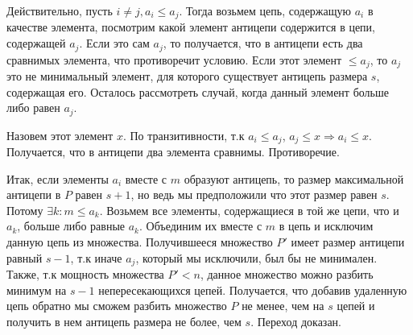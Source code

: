 {    Действительно, пусть $i \neq j, a_i \le a_j$. Тогда возьмем цепь, содержащую $a_i$ в качестве элемента, посмотрим какой элемент антицепи содержится в цепи, содержащей $a_j$. Если это сам $a_j$, то получается, что в антицепи есть два сравнимых элемента, что противоречит условию. Если этот элемент $\le a_j$, то $a_j$ это не минимальный элемент, для которого существует антицепь размера $s$, содержащая его. Осталось рассмотреть случай, когда данный элемент больше либо равен $a_j$.

    Назовем этот элемент $x$. По транзитивности, т.к $a_i \le a_j$, $a_j \le x \Rightarrow a_i \le x$. Получается, что в антицепи два элемента сравнимы. Противоречие.

    Итак, если элементы $a_i$ вместе с $m$ образуют антицепь, то размер максимальной антицепи в $P$ равен $s + 1$, но ведь мы предположили что этот размер равен $s$. Потому $\exists k: m \le a_k$. Возьмем все элементы, содержащиеся в той же цепи, что и $a_k$, больше либо равные $a_k$. Объединим их вместе с $m$ в цепь и исключим данную цепь из множества. Получившееся множество $P'$ имеет размер антицепи равный $s - 1$, т.к иначе $a_j$, который мы исключили, был бы не минимален. Также, т.к мощность множества $P' < n$, данное множество можно разбить минимум на $s - 1$ непересекающихся цепей. Получается, что добавив удаленную цепь обратно мы сможем разбить множество $P$ не менее, чем на $s$ цепей и получить в нем антицепь размера не более, чем $s$. Переход доказан.
}
